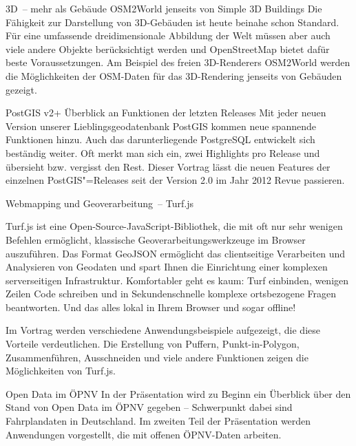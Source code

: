 %
{3D~-- mehr als Gebäude}%
{OSM2World jenseits von Simple 3D Buildings}%
{%
Die Fähigkeit zur Darstellung von 3D-Gebäuden ist heute beinahe schon Standard. Für eine umfassende
dreidimensionale Abbildung der Welt müssen aber auch viele andere Objekte berücksichtigt werden und
OpenStreetMap bietet dafür beste Voraussetzungen. Am Beispiel des freien 3D-Renderers OSM2World
werden die Möglichkeiten der OSM-Daten für das 3D-Rendering jenseits von Gebäuden gezeigt.%
}




%
{PostGIS v2+}%
{Überblick an Funktionen der letzten Releases}%
{%
Mit jeder neuen Version unserer Lieblingsgeodatenbank PostGIS kommen neue spannende Funktionen
hinzu. Auch das darunterliegende PostgreSQL entwickelt sich beständig weiter. Oft merkt man sich
ein, zwei Highlights pro Release und übersieht bzw. vergisst den Rest. Dieser Vortrag lässt die
neuen Features der einzelnen PostGIS"=Releases seit der Version 2.0 im Jahr 2012 Revue passieren.%
}

%
{Webmapping und Geoverarbeitung~-- Turf.js}%
{}%
{%
Turf.js ist eine Open-Source-JavaScript-Bibliothek, die mit oft nur sehr wenigen Befehlen
ermöglicht, klassische Geoverarbeitungswerkzeuge im Browser auszuführen. Das Format GeoJSON
ermöglicht das clientseitige Verarbeiten und Analysieren von Geodaten und spart Ihnen die
Einrichtung einer komplexen serverseitigen Infrastruktur. Komfortabler geht es kaum: Turf einbinden,
wenigen Zeilen Code schreiben und in Sekundenschnelle komplexe ortsbezogene Fragen beantworten. Und
das alles lokal in Ihrem Browser und sogar offline!

Im Vortrag werden verschiedene Anwendungsbeispiele aufgezeigt, die diese Vorteile verdeutlichen. Die
Erstellung von Puffern, Punkt-in-Polygon, Zusammenführen, Ausschneiden und viele
andere Funktionen zeigen die Möglichkeiten von Turf.js.%
}

%
{Open Data im ÖPNV}%
{}%
{%
In der Präsentation wird zu Beginn ein Überblick über den Stand von Open Data im ÖPNV gegeben --
Schwerpunkt dabei sind Fahrplandaten in Deutschland. Im zweiten Teil der Präsentation werden
Anwendungen vorgestellt, die mit offenen ÖPNV-Daten arbeiten.%
}
\vfill

\vfill
\vfill

